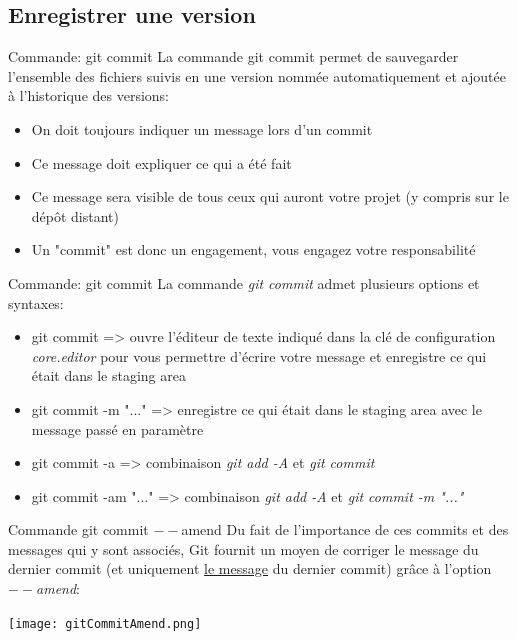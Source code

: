 \documentclass{beamer}
\begin{document}
\subsection{Enregistrer une version}

\begin{frame}{Commande: git commit}
La commande git commit permet de sauvegarder l'ensemble des fichiers suivis en une version nommée automatiquement et ajoutée à l'historique des versions:
\smallskip
\begin{itemize}
    \item On doit toujours indiquer un message lors d'un commit\\
    \item Ce message doit expliquer ce qui a été fait
    \item Ce message sera visible de tous ceux qui auront votre projet (y compris sur le dépôt distant)
    \item Un "commit" est donc un engagement, vous engagez votre responsabilité
\end{itemize}
\end{frame}

\begin{frame}{Commande: git commit}
La commande \textit{git commit} admet plusieurs options et syntaxes:
\begin{itemize}
	\item git commit => ouvre l'éditeur de texte indiqué dans la clé de configuration 	          \textit{core.editor} pour vous permettre d'écrire votre message et enregistre 
	      ce qui était dans le staging area
	\item git commit -m "..." => enregistre ce qui était dans le staging area avec le 
	      message passé en paramètre
	\item git commit -a => combinaison \textit{git add -A} et \textit{git commit}
	\item git commit -am "..." => combinaison \textit{git add -A} et \textit{git commit -m "..."}
\end{itemize}
\end{frame}


\begin{frame}{Commande git commit $--$amend}
Du fait de l'importance de ces commits et des messages qui y sont associés, Git fournit un moyen de corriger le message du dernier commit (et uniquement \underline{le message} du dernier commit) grâce à l'option \textit{$--$amend}:
\begin{center}
	\texttt{[image: gitCommitAmend.png]}
\end{center}
\end{frame}
\end{document}
